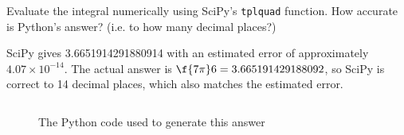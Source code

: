 \documentclass[a4paper]{article}
\begin{document}
\begin{questionbody}
Evaluate the integral numerically using SciPy’s \texttt{tplquad} function. How accurate is Python’s answer? (i.e. to how many decimal places?)
\end{questionbody}

SciPy gives 3.6651914291880914 with an estimated error of approximately $4.07 \times 10^{-14}$. The actual answer is $\f{7\pi}6 = 3.665191429188092$, so SciPy is correct to 14 decimal places, which also matches the estimated error.

\begin{figure}[h]
	\centering
	\inputminted{python}{./code/Q3.py}
	\caption{The Python code used to generate this answer}
\end{figure}
\end{document}
